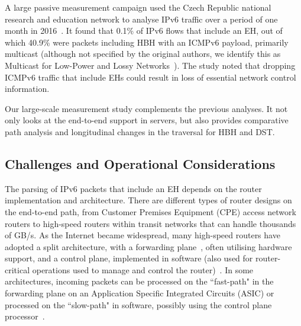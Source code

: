 \documentclass[conference]{IEEEtran}
\begin{document}

A large passive measurement campaign used the Czech Republic national
research and education network to analyse IPv6 traffic over a period of one month in
2016~\cite{passive-threats}. It found that 0.1\% of IPv6 flows
that include an EH, out of which 40.9\% were packets including HBH with an ICMPv6
payload, primarily multicast (although not specified by the original authors,
we identify this as Multicast for Low-Power and Lossy Networks~\cite{RFC7731}).
The study noted that dropping ICMPv6 traffic that include EHs could result in
loss of essential network control information. 


Our large-scale measurement study complements the previous analyses. It not only
looks at the end-to-end support in servers, but also provides comparative path
analysis and longitudinal changes in the traversal for HBH and DST.

\subsection{Challenges and Operational Considerations}

The parsing of IPv6 packets that include an EH depends on 
the router implementation and architecture. There are different types of router designs on the end-to-end path, from Customer Premises Equipment (CPE) access network routers to high-speed routers within transit networks that can handle thousands of GB/s. As the Internet became widespread, many high-speed routers have adopted a split architecture, 
with a forwarding plane~\cite{RFC3654}, often utilising hardware support, and a control plane, implemented in software (also used for router-critical operations used to manage and control the router)~\cite{router-architecture}.
In some architectures, incoming packets can be processed on the ``fast-path" in the forwarding plane on an Application Specific Integrated Circuits (ASIC) or processed on the ``slow-path" in software, possibly using the control plane processor~\cite{RFC3654}.
\end{document}
